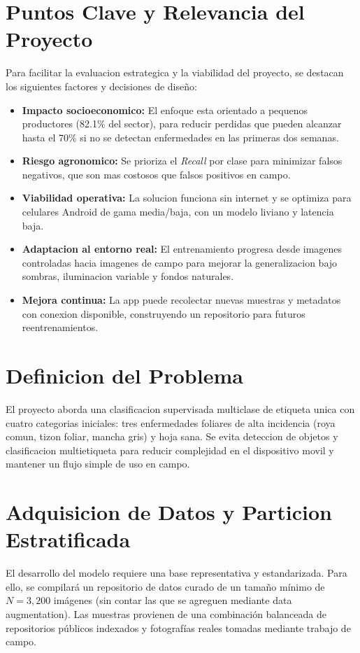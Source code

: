 \documentclass[10pt,journal,compsoc]{IEEEtran} %
\begin{document}
\section{Puntos Clave y Relevancia del Proyecto}
Para facilitar la evaluacion estrategica y la viabilidad del proyecto, se destacan los siguientes factores y decisiones de diseño:
\begin{itemize}
    \item \textbf{Impacto socioeconomico:} El enfoque esta orientado a pequenos productores (82.1\% del sector), para reducir perdidas que pueden alcanzar hasta el 70\% si no se detectan enfermedades en las primeras dos semanas.
    \item \textbf{Riesgo agronomico:} Se prioriza el \textit{Recall} por clase para minimizar falsos negativos, que son mas costosos que falsos positivos en campo.
    \item \textbf{Viabilidad operativa:} La solucion funciona sin internet y se optimiza para celulares Android de gama media/baja, con un modelo liviano y latencia baja.
    \item \textbf{Adaptacion al entorno real:} El entrenamiento progresa desde imagenes controladas hacia imagenes de campo para mejorar la generalizacion bajo sombras, iluminacion variable y fondos naturales.
    \item \textbf{Mejora continua:} La app puede recolectar nuevas muestras y metadatos con conexion disponible, construyendo un repositorio para futuros reentrenamientos.
\end{itemize}

\section{Definicion del Problema}
El proyecto aborda una clasificacion supervisada multiclase de etiqueta unica con cuatro categorias iniciales: tres enfermedades foliares de alta incidencia (roya comun, tizon foliar, mancha gris) y hoja sana. Se evita deteccion de objetos y clasificacion multietiqueta para reducir complejidad en el dispositivo movil y mantener un flujo simple de uso en campo.

\section{Adquisicion de Datos y Particion Estratificada}
El desarrollo del modelo requiere una base representativa y estandarizada. Para ello, se compilará un repositorio de datos curado de un tamaño mínimo de $N = 3,200$ imágenes (sin contar las que se agreguen mediante data augmentation). Las muestras provienen de una combinación balanceada de repositorios públicos indexados y fotografías reales tomadas mediante trabajo de campo.
\end{document}
